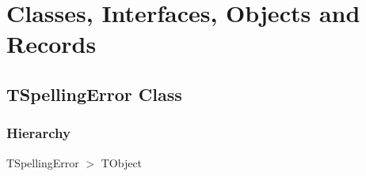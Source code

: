 \documentclass{report}
\newif\ifpdf
\begin{document}
\section{Classes, Interfaces, Objects and Records}
\ifpdf
\subsection*{\large{\textbf{TSpellingError Class}}\normalsize\hspace{1ex}\hrulefill}
\else
\subsection*{TSpellingError Class}
\fi
\label{PasDoc_Aspell.TSpellingError}
\subsubsection*{\large{\textbf{Hierarchy}}\normalsize\hspace{1ex}\hfill}
TSpellingError {$>$} TObject
\end{document}
